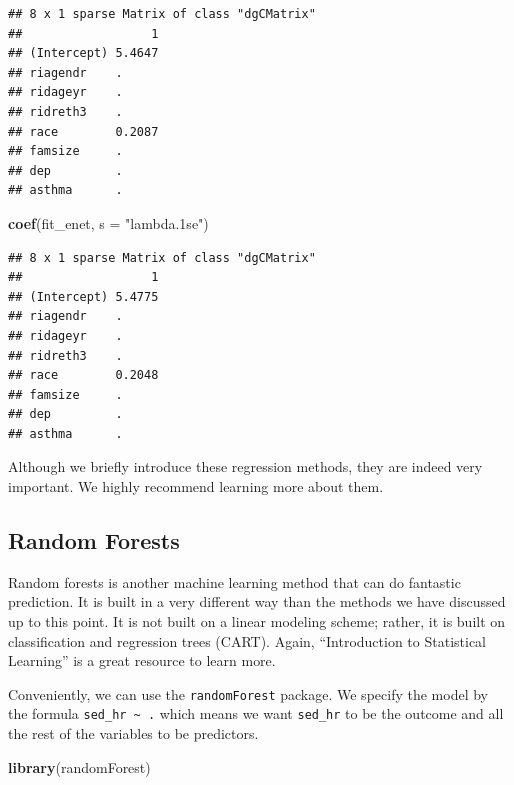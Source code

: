 \documentclass[]{tufte-book}
\newenvironment{Shaded}{}{}
\newcommand{\KeywordTok}[1]{\textcolor[rgb]{0.00,0.44,0.13}{\textbf{#1}}}
\newcommand{\DataTypeTok}[1]{\textcolor[rgb]{0.56,0.13,0.00}{#1}}
\newcommand{\StringTok}[1]{\textcolor[rgb]{0.25,0.44,0.63}{#1}}
\newcommand{\NormalTok}[1]{#1}
\theoremstyle{definition}
\theoremstyle{definition}
\theoremstyle{remark}
\begin{document}
\begin{verbatim}
## 8 x 1 sparse Matrix of class "dgCMatrix"
##                  1
## (Intercept) 5.4647
## riagendr    .     
## ridageyr    .     
## ridreth3    .     
## race        0.2087
## famsize     .     
## dep         .     
## asthma      .
\end{verbatim}

\begin{Shaded}
\begin{Highlighting}[]
\KeywordTok{coef}\NormalTok{(fit_enet, }\DataTypeTok{s =} \StringTok{"lambda.1se"}\NormalTok{)}
\end{Highlighting}
\end{Shaded}

\begin{verbatim}
## 8 x 1 sparse Matrix of class "dgCMatrix"
##                  1
## (Intercept) 5.4775
## riagendr    .     
## ridageyr    .     
## ridreth3    .     
## race        0.2048
## famsize     .     
## dep         .     
## asthma      .
\end{verbatim}

Although we briefly introduce these regression methods, they are indeed
very important. We highly recommend learning more about them.

\subsection*{Random Forests}\label{random-forests}

Random forests is another machine learning method that can do fantastic
prediction. It is built in a very different way than the methods we have
discussed up to this point. It is not built on a linear modeling scheme;
rather, it is built on classification and regression trees (CART).
Again, ``Introduction to Statistical Learning'' is a great resource to
learn more.

Conveniently, we can use the \texttt{randomForest} package. We specify
the model by the formula \texttt{sed\_hr\ \textasciitilde{}\ .} which
means we want \texttt{sed\_hr} to be the outcome and all the rest of the
variables to be predictors.

\begin{Shaded}
\begin{Highlighting}[]
\KeywordTok{library}\NormalTok{(randomForest)}
\end{Highlighting}
\end{Shaded}
\end{document}
